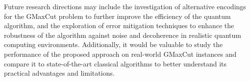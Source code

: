 Future research directions may include the investigation of alternative encodings for the GMaxCut problem to further improve the efficiency of the quantum algorithm, and the exploration of error mitigation techniques to enhance the robustness of the algorithm against noise and decoherence in realistic quantum computing environments. Additionally, it would be valuable to study the performance of the proposed approach on real-world GMaxCut instances and compare it to state-of-the-art classical algorithms to better understand its practical advantages and limitations.

